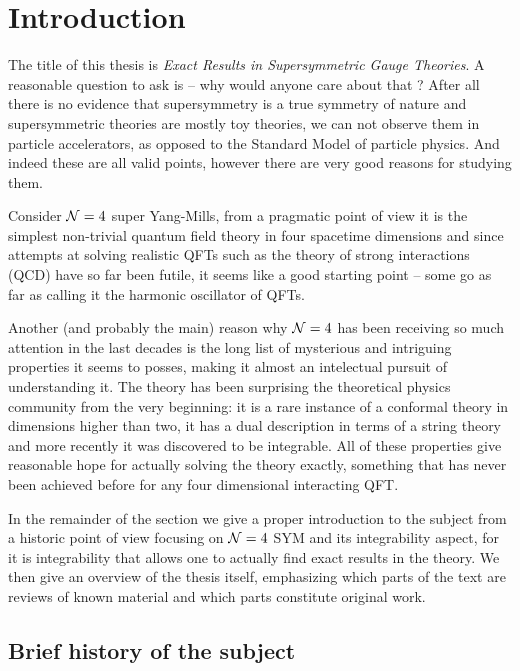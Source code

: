 
\section{Introduction}

The title of this thesis is \emph{Exact Results in Supersymmetric Gauge Theories}. A reasonable question to ask is -- why would anyone care about that ? 
After all there is no evidence that supersymmetry is a true symmetry of nature and supersymmetric theories are mostly toy theories, we can not observe them in particle accelerators, as opposed to the Standard Model of particle physics. 
And indeed these are all valid points, however there are very good reasons for studying them. 

Consider $\mathcal{N}=4$ super Yang-Mills, from a pragmatic point of view it is the simplest non-trivial quantum field theory in four spacetime dimensions and since attempts at solving realistic QFTs such as the theory of strong interactions (QCD) have so far been futile, it seems like a good starting point -- some go as far as calling it the harmonic oscillator of QFTs. 

Another (and probably the main) reason why $\mathcal{N}=4$ has been receiving so much attention in the last decades is the long list of mysterious and intriguing properties it seems to posses, making it almost an intelectual pursuit of understanding it. 
The theory has been surprising the theoretical physics community from the very beginning: it is a rare instance of a conformal theory in dimensions higher than two, it has a dual description in terms of a string theory and more recently it was discovered to be integrable. 
All of these properties give reasonable hope for actually solving the theory exactly, something that has never been achieved before for any four dimensional interacting QFT.

In the remainder of the section we give a proper introduction to the subject from a historic point of view focusing on $\mathcal{N}=4$ SYM and its integrability aspect, for it is integrability that allows one to actually find exact results in the theory. We then give an overview of the thesis itself, emphasizing which parts of the text are reviews of known material and which parts constitute original work.

\subsection{Brief history of the subject}

